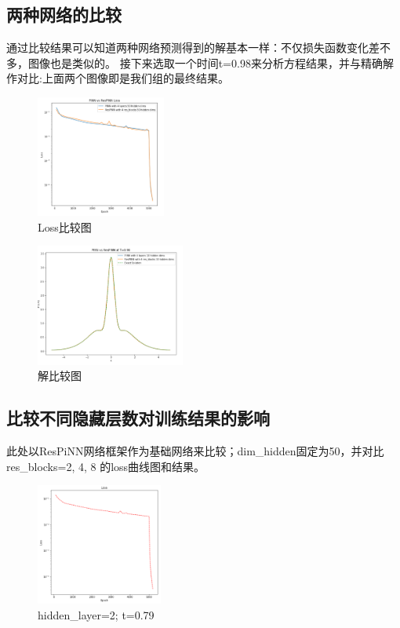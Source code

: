 \documentclass[addpoints,answers]{exam}
\begin{document}
   \subsection{两种网络的比较}
    通过比较结果可以知道两种网络预测得到的解基本一样：不仅损失函数变化差不多，图像也是类似的。
    接下来选取一个时间t=0.98来分析方程结果，并与精确解作对比:上面两个图像即是我们组的最终结果。
    \clearpage
    \begin{figure}
    	\centering
    	\includegraphics[height=4cm]{6.png}
    	\caption{Loss比较图}
    \end{figure}
    
    \begin{figure}
    	\centering
    	\includegraphics[height=4cm]{7.png}
    	\caption{解比较图}
    \end{figure}

   \subsection{比较不同隐藏层数对训练结果的影响}
   此处以ResPiNN网络框架作为基础网络来比较；dim\_hidden固定为50，并对比 res\_blocks=2, 4, 8 的loss曲线图和结果。
   \clearpage

   \begin{figure}
	\centering
	\includegraphics[height=4cm]{8.png}
	\caption{hidden\_layer=2; t=0.79}
   \end{figure}
\end{document}
